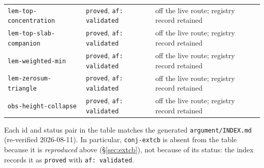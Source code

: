 \begin{longtable}{@{}p{}p{}p{}@{}}
\texttt{lem-top-concentration} & \texttt{proved}, \texttt{af: validated} & off the live route; registry record retained \\
\texttt{lem-top-slab-companion} & \texttt{proved}, \texttt{af: validated} & off the live route; registry record retained \\
\texttt{lem-weighted-min} & \texttt{proved}, \texttt{af: validated} & off the live route; registry record retained \\
\texttt{lem-zerosum-triangle} & \texttt{proved}, \texttt{af: validated} & off the live route; registry record retained \\
\texttt{obs-height-collapse} & \texttt{proved}, \texttt{af: validated} & off the live route; registry record retained \\
\bottomrule
\end{longtable}

\noindent
Each id and status pair in the table matches the generated
\texttt{argument/INDEX.md} (re-verified 2026-08-11). In particular, \texttt{conj-extcb} is absent from
the table because it is \emph{reproduced} above (\S\ref{sec:extcb}), not because of its
status: the index records it as \texttt{proved} with \texttt{af: validated}.
